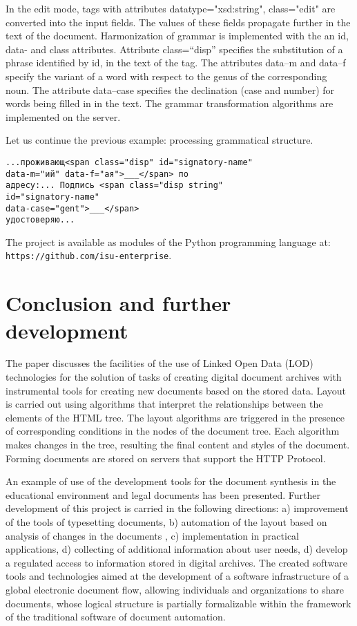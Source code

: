 \documentclass[conference,a4paper]{IEEEtran}
\providecommand\url[1]{\texttt{#1}}
\begin{document}
In the edit mode, tags with attributes
datatype="xsd:string", class="edit" are converted into the input
fields. The values of these fields propagate further in the text of the
document. Harmonization of grammar is implemented with the an id, data-
and class attributes. Attribute class=``disp'' specifies the
substitution of a phrase identified by id, in the text of the tag. The
attributes data--m and data--f specify the variant of a word with respect
to the genus of the corresponding noun. The attribute data--case
specifies the declination (case and number) for words being filled in in
the text. The grammar transformation algorithms are implemented on the
server.

Let us continue the previous example: processing grammatical structure.

\begin{verbatim}
...проживающ<span class="disp" id="signatory-name"
data-m="ий" data-f="ая">___</span> по
адресу:... Подпись <span class="disp string"
id="signatory-name"
data-case="gent">___</span>
удостоверяю...
\end{verbatim}

The project is available as modules of the Python programming language
at: \url{https://github.com/isu-enterprise}.

\section{Conclusion and further development}
\label{sec:conc}

The paper discusses the facilities of the use of Linked Open Data (LOD)
technologies for the solution of tasks of {creating} digital document
archives with instrumental tools for creating new documents based on the
stored data. Layout is carried out using algorithms that interpret the
relationships between the elements of the HTML tree. The layout
algorithms are triggered in the presence of corresponding conditions in
the nodes of the document tree. Each algorithm makes changes in the
tree, resulting the final content and styles of the document. Forming
documents are stored on servers that support the HTTP Protocol.

An example of use of the development tools for the document synthesis in
the educational environment and legal documents has been presented.
Further development of this project is carried in the following
directions: a) improvement of the tools of typesetting documents, b)
automation of the layout based on analysis of changes in the documents
\cite{b2}, c) implementation in practical applications, d) collecting of
additional information about user needs, d) develop a regulated access
to information stored in digital archives. The created software tools
and technologies aimed at the development of a software infrastructure
of a global electronic document flow, allowing individuals and
organizations to share documents, whose logical structure is partially
formalizable within the framework of the traditional software of
document automation.
\end{document}
